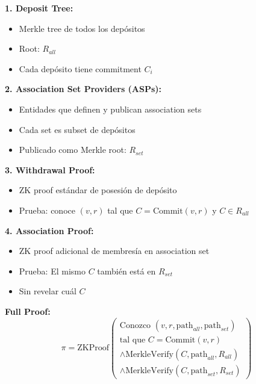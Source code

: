 \documentclass[11pt,a4paper,twoside]{book}
\theoremstyle{definition}
\theoremstyle{remark}
\begin{document}
\begin{mathnote}
\textbf{1. Deposit Tree:}
\begin{itemize}
    \item Merkle tree de todos los depósitos
    \item Root: $R_{all}$
    \item Cada depósito tiene commitment $C_i$
\end{itemize}

\textbf{2. Association Set Providers (ASPs):}
\begin{itemize}
    \item Entidades que definen y publican association sets
    \item Cada set es subset de depósitos
    \item Publicado como Merkle root: $R_{set}$
\end{itemize}

\textbf{3. Withdrawal Proof:}
\begin{itemize}
    \item ZK proof estándar de posesión de depósito
    \item Prueba: conoce $(v, r)$ tal que $C = \text{Commit}(v, r)$ y $C \in R_{all}$
\end{itemize}

\textbf{4. Association Proof:}
\begin{itemize}
    \item ZK proof adicional de membresía en association set
    \item Prueba: El mismo $C$ también está en $R_{set}$
    \item Sin revelar cuál $C$
\end{itemize}

\textbf{Full Proof:}
\[
\pi = \text{ZKProof}\left(
\begin{array}{l}
\text{Conozco } (v, r, \text{path}_{all}, \text{path}_{set}) \\
\text{tal que } C = \text{Commit}(v, r) \\
\land \text{MerkleVerify}(C, \text{path}_{all}, R_{all}) \\
\land \text{MerkleVerify}(C, \text{path}_{set}, R_{set})
\end{array}
\right)
\]
\end{mathnote}
\end{document}

